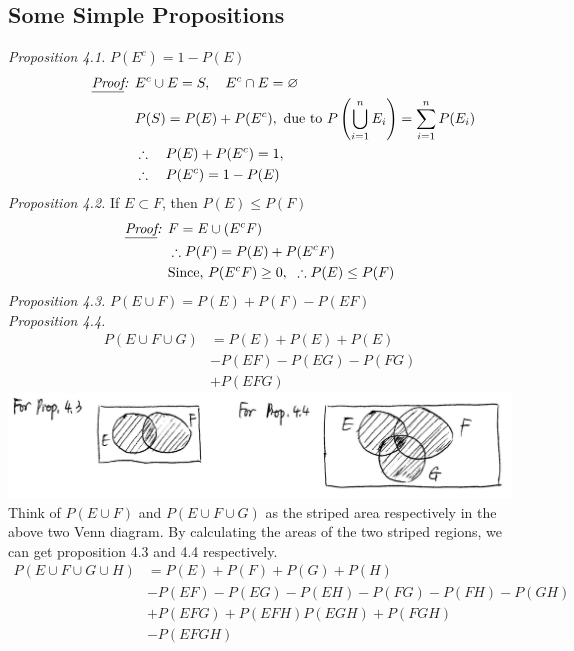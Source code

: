 \documentclass[11pt, letterpaper]{article}
\begin{document}
\subsection{Some Simple Propositions}
\textit{Proposition 4.1.} $P(E^c) = 1 - P(E)$
\begin{align*}
   \hspace{1.2cm} \textit{\underline{Proof}: } &E^c \cup E = S, \quad E^c \cap E = \varnothing \\
   &P(S) = P(E) + P(E^c), \text{ due to } P\left(\bigcup_{i=1}^n E_i \right) = \sum_{i=1}^n P(E_i) \\
  &\therefore \quad P(E) + P(E^c) = 1, \\
  &\therefore \quad P(E^c) = 1 - P(E)
\end{align*}
\textit{Proposition 4.2. } If $E \subset F$, then $P(E) \le P(F)$
\begin{align*}
  \textit{\underline{Proof}: } &F = E \cup (E^cF) \\
  &\therefore P(F) = P(E) + P(E^cF) \\
  &\text{Since, } P(E^cF) \ge 0, \text{ } \therefore P(E) \le P(F)
\end{align*}
\textit{Proposition 4.3. } $P(E \cup F) = P(E) + P(F) - P(EF)$ \\
\textit{Proposition 4.4. }
\begin{align*}
  P(E \cup F \cup G) &= P(E) + P(E) + P(E) \\
  &- P(EF) - P(EG) - P(FG)  \\
  &+ P(EFG)
\end{align*}
\includegraphics[scale=0.5]{2-5} \\
Think of $P(E \cup F)$ and $P(E \cup F \cup G)$ as the striped area respectively in the above two Venn diagram. By calculating the areas of the two striped regions, we can get proposition 4.3 and 4.4 respectively.
\begin{align*}
  P(E \cup F \cup G \cup H) &= P(E) + P(F) + P(G) + P(H) \\
  &- P(EF) - P(EG) - P(EH) - P(FG) - P(FH) - P(GH) \\
  &+ P(EFG) + P(EFH) P(EGH) + P(FGH) \\
  &- P(EFGH)
\end{align*} \clearpage
\end{document}
